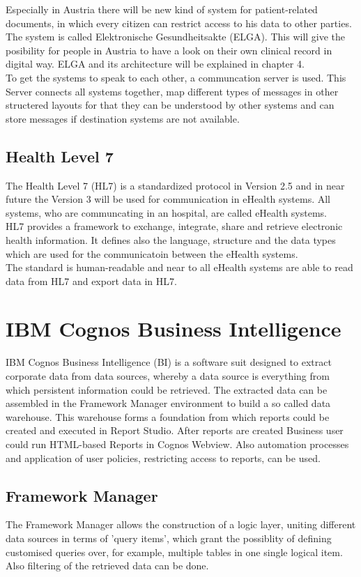 \documentclass[a4paper]{article}
\begin{document}
	    Especially in Austria there will be new kind of system for patient-related
	    documents, in which every citizen can restrict access to his data to other
	    parties. The system is called Elektronische Gesundheitsakte (ELGA).
	    This will give the posibility for people in Austria to have a look on their
	    own clinical record in digital way. ELGA and its architecture will be
	    explained in chapter 4.\\
	    To get the systems to speak to each other, a communcation server
	    is used.
	    This Server connects all systems together, map different types of messages
	    in other structered layouts for that they can be understood by other
	    systems and can store messages if destination systems are not available.
	\subsection{Health Level 7}
		The Health Level 7 (HL7) is a standardized protocol in Version 2.5 and in near
		future the Version 3 will be used for communication in eHealth systems.
		All systems, who are communcating in an hospital, are called eHealth
		systems.\\
		HL7 provides a framework to exchange, integrate, share and retrieve 
		electronic health information. It defines also the language, structure and the
		data types which are used for the communicatoin between the eHealth systems.\\
		The standard is human-readable and near to all eHealth systems are able to
		read data from HL7 and export data in HL7.
		
	\newpage
	
	\section{IBM Cognos Business Intelligence}
	IBM Cognos Business Intelligence (BI) is a software suit designed to extract corporate data from data sources,
	whereby a data source is everything from which persistent information could be retrieved. The extracted data
	can be assembled in the Framework Manager environment to build a so called data warehouse. This warehouse forms
	a foundation from which reports could be created and executed in Report Studio. After reports are created Business
	user could run HTML-based Reports in Cognos Webview. Also automation processes and application of user policies,
	restricting access to reports, can be used.
	
	\subsection{Framework Manager}
	The Framework Manager allows the construction of a logic layer, uniting different data sources in terms of 'query
	items', which grant the possiblity of defining customised queries over, for example, multiple tables in one single
	logical item. Also filtering of the retrieved data can be done.
\end{document}
